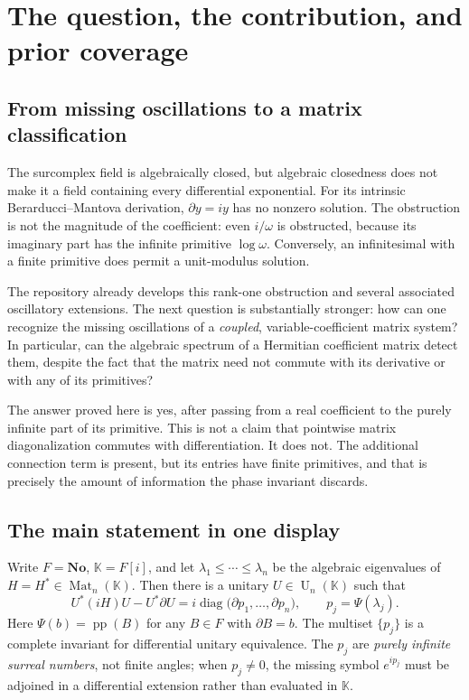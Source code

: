 \documentclass[11pt,a4paper]{article}
\numberwithin{equation}{section}
\theoremstyle{definition}
\theoremstyle{remark}
\newcommand{\No}{\mathbf{No}}
\newcommand{\K}{\mathbb K}
\newcommand{\pp}{\operatorname{pp}}
\newcommand{\diag}{\operatorname{diag}}
\newcommand{\UU}{\operatorname U}
\newcommand{\Mat}{\operatorname{Mat}}
\begin{document}
\hypersetup{pageanchor=true}
\tableofcontents
\clearpage{}

\section{The question, the contribution, and prior coverage}\label{sec:intro}

\subsection{From missing oscillations to a matrix classification}
The surcomplex field is algebraically closed, but algebraic closedness does
not make it a field containing every differential exponential. For its
intrinsic Berarducci--Mantova derivation, $\partial y=iy$ has no nonzero
solution. The obstruction is not the magnitude of the coefficient: even
$i/\omega$ is obstructed, because its imaginary part has the infinite
primitive $\log\omega$. Conversely, an infinitesimal with a finite primitive
does permit a unit-modulus solution.

The repository already develops this rank-one obstruction and several
associated oscillatory extensions. The next question is substantially
stronger: how can one recognize the missing oscillations of a \emph{coupled},
variable-coefficient matrix system? In particular, can the algebraic
spectrum of a Hermitian coefficient matrix detect them, despite the fact
that the matrix need not commute with its derivative or with any of its
primitives?

The answer proved here is yes, after passing from a real coefficient to the
purely infinite part of its primitive. This is not a claim that pointwise
matrix diagonalization commutes with differentiation. It does not. The
additional connection term is present, but its entries have finite
primitives, and that is precisely the amount of information the phase
invariant discards.

\subsection{The main statement in one display}
Write $F=\No$, $\K=F[i]$, and let $\lambda_1\le\cdots\le\lambda_n$ be the
algebraic eigenvalues of $H=H^*\in\Mat_n(\K)$. Then there is a unitary
$U\in\UU_n(\K)$ such that
\begin{equation}\label{eq:main-intro}
 U^*(iH)U-U^*\partial U
   =i\diag\bigl(\partial p_1,\ldots,\partial p_n\bigr),
 \qquad p_j=\Psi(\lambda_j).
\end{equation}
Here $\Psi(b)=\pp(B)$ for any $B\in F$ with $\partial B=b$. The multiset
$\{p_j\}$ is a complete invariant for differential unitary equivalence.
The $p_j$ are \emph{purely infinite surreal numbers}, not finite angles;
when $p_j\ne0$, the missing symbol $e^{ip_j}$ must be adjoined in a
differential extension rather than evaluated in $\K$.
\end{document}
